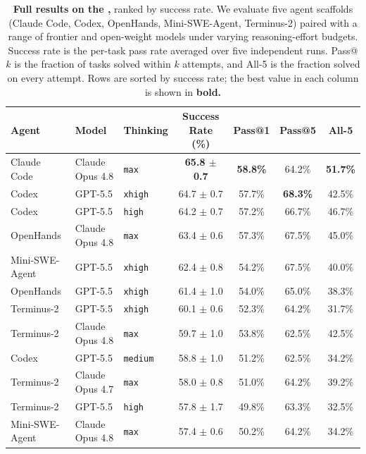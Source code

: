 \begin{table}[t]
\centering
\small
\caption{\textbf{Full results on the \benchname,} ranked by success rate. We evaluate five agent
scaffolds (Claude Code, Codex, OpenHands, Mini-SWE-Agent, Terminus-2) paired
with a range of frontier and open-weight models under varying reasoning-effort
budgets. Success rate is the per-task pass rate
averaged over five independent runs. Pass@$k$ is the fraction of tasks solved within $k$ attempts, and
All-5 is the fraction solved on every attempt. Rows are sorted by success rate;
the best value in each column is shown in \textbf{bold.}}\label{tab:full-results}
\setlength{\tabcolsep}{8pt}
\renewcommand{\arraystretch}{1.05}
\begin{tabular}{l l l c c c c}
\toprule
Agent & Model & Thinking & Success Rate (\%) & Pass@1 & Pass@5 & All-5 \\
\midrule
Claude Code    & Claude Opus 4.8           & \texttt{max}    & \textbf{65.8 $\pm$ 0.7} & \textbf{58.8\%} & 64.2\% & \textbf{51.7\%} \\
Codex          & GPT-5.5                   & \texttt{xhigh}  & 64.7 $\pm$ 0.7 & 57.7\% & \textbf{68.3\%} & 42.5\% \\
Codex          & GPT-5.5                   & \texttt{high}   & 64.2 $\pm$ 0.7 & 57.2\% & 66.7\% & 46.7\% \\
OpenHands      & Claude Opus 4.8           & \texttt{max}    & 63.4 $\pm$ 0.6 & 57.3\% & 67.5\% & 45.0\% \\
Mini-SWE-Agent & GPT-5.5                   & \texttt{xhigh}  & 62.4 $\pm$ 0.8 & 54.2\% & 67.5\% & 40.0\% \\
OpenHands      & GPT-5.5                   & \texttt{xhigh}  & 61.4 $\pm$ 1.0 & 54.0\% & 65.0\% & 38.3\% \\
Terminus-2     & GPT-5.5                   & \texttt{xhigh}  & 60.1 $\pm$ 0.6 & 52.3\% & 64.2\% & 31.7\% \\
Terminus-2     & Claude Opus 4.8           & \texttt{max}    & 59.7 $\pm$ 1.0 & 53.8\% & 62.5\% & 42.5\% \\
Codex          & GPT-5.5                   & \texttt{medium} & 58.8 $\pm$ 1.0 & 51.2\% & 62.5\% & 34.2\% \\
Terminus-2     & Claude Opus 4.7           & \texttt{max}    & 58.0 $\pm$ 0.8 & 51.0\% & 64.2\% & 39.2\% \\
Terminus-2     & GPT-5.5                   & \texttt{high}   & 57.8 $\pm$ 1.7 & 49.8\% & 63.3\% & 32.5\% \\
Mini-SWE-Agent & Claude Opus 4.8           & \texttt{max}    & 57.4 $\pm$ 0.6 & 50.2\% & 64.2\% & 34.2\% \\

\end{tabular}
\end{table}
